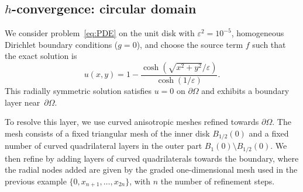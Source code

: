 \documentclass[a4paper,twoside,10pt]{article}
\newcommand{\eps}{\varepsilon}
\numberwithin{equation}{section}
\begin{document}
\subsection{\texorpdfstring{$h$}{h}-convergence: circular domain}\label{sec:CurvilinearElements}
We consider problem~\eqref{eq:PDE} on the unit disk with $\eps^2=10^{-5}$, homogeneous Dirichlet boundary conditions ($g=0$), and choose the source term $f$ such that the exact solution is
\begin{equation}\label{eq:circlesol}
	u(x,y)
	=
	1-\frac{\cosh\!\left(\sqrt{x^2+y^2}/\eps\right)}
	        {\cosh(1/\eps)} .
\end{equation}
This radially symmetric solution satisfies $u=0$ on $\partial\Omega$ and exhibits a boundary layer near~$\partial \Omega$. 

To resolve this layer, we use curved anisotropic meshes refined towards $\partial\Omega$.
The mesh consists of a fixed triangular mesh of the inner disk $B_{1/2}(0)$ and a fixed number of curved quadrilateral layers in the outer part $B_1(0)\setminus B_{1/2}(0)$.
We then refine by adding
layers of curved quadrilaterals towards the boundary, where the radial nodes added are given by the graded one-dimensional mesh used in the previous example $\{0,x_{n+1},\dots,x_{2n}\}$, with $n$ the number of refinement steps.
\end{document}
